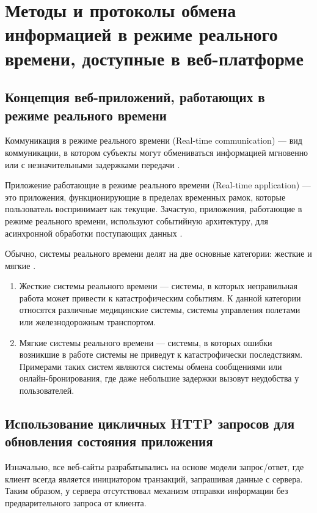 \chapter{Методы и протоколы обмена информацией в режиме реального времени, доступные в веб-платформе}

\section{Концепция веб-приложений, работающих в режиме реального времени}

Коммуникация в режиме реального времени (Real-time communication) — вид коммуникации, в котором субъекты могут обмениваться информацией мгновенно или с незначительными задержками передачи \cite{RealTimeCommunicationBase}.

Приложение работающие в режиме реального времени (Real-time application) — это приложения, функционирующие в пределах временных рамок, которые пользователь воспринимает как текущие. Зачастую, приложения, работающие в режиме реального времени, используют событийную архитектуру, для асинхронной обработки поступающих данных \cite{RealTimeCommunicationBaseTwo}.

Обычно, системы реального времени делят на две основные категории: жесткие и мягкие \cite{IntroRealTimeEthrenet}.

\begin{enumerate} 
  \item Жесткие системы реального времени — системы, в которых неправильная работа может привести к катастрофическим событиям. К данной категории относятся различные медицинские системы, системы управления полетами или железнодорожным транспортом.
  
  \item Мягкие системы реального времени — системы, в которых ошибки возникшие в работе системы не приведут к катастрофически последствиям. Примерами таких систем являются системы обмена сообщениями или онлайн-бронирования, где даже небольшие задержки вызовут неудобства у пользователей.
\end{enumerate}

\section{Использование цикличных HTTP запросов для обновления состояния приложения}

Изначально, все веб-сайты разрабатывались на основе модели запрос/ответ, где клиент всегда является инициатором транзакций, запрашивая данные с сервера. Таким образом, у сервера отсутствовал механизм отправки информации без предварительного запроса от клиента.

